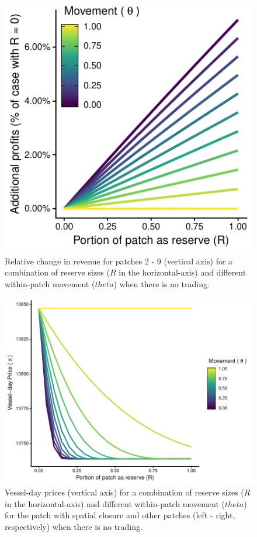 \documentclass[12pt]{article}
\begin{document}
\begin{figure}[htbp]
\centering
\includegraphics{img/profits_PNA_notKIR_no_trading_plot.pdf}
\caption{\label{fig:profits_PNA_notKIR_no_trading_plot}Relative change in revenue for patches 2 - 9 (vertical axis) for a combination of reserve sizes ($R$ in the horizontal-axis) and different within-patch movement ($theta$) when there is no trading.}
\end{figure}

\begin{figure}
\centering
\includegraphics{img/vessel_day_price_with_trading_plot.pdf}
\caption{\label{fig:vessel_day_price_with_trading_plot}Vessel-day prices (vertical axis) for a combination of reserve sizes ($R$ in the horizontal-axis) and different within-patch movement ($theta$) for the patch with spatial closure and other patches (left - right, respectively) when there is no trading.}
\end{figure}
\end{document}
